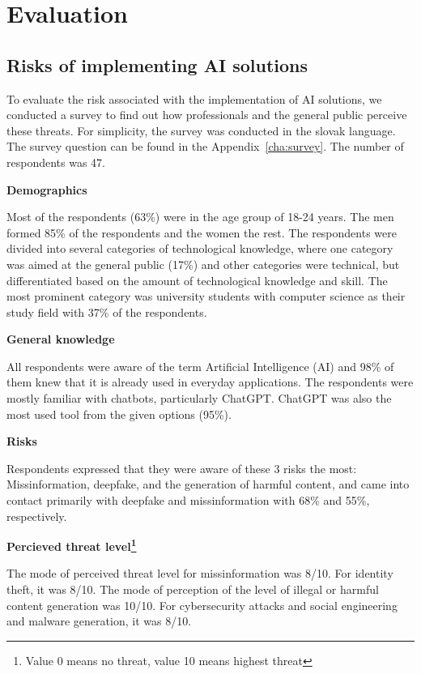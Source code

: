 \chapter{Evaluation \label{cha:eva}}

\section{Risks of implementing AI solutions \label{sec:eval_risks_survey}}
To evaluate the risk associated with the implementation of AI solutions, we conducted a survey to find out how professionals and the general public perceive these threats. For simplicity, the survey was conducted in the slovak language. The survey question can be found in the Appendix~\ref{cha:survey}. The number of respondents was 47.

\textbf{Demographics}

Most of the respondents (63\%) were in the age group of 18-24 years. The men formed 85\% of the respondents and the women the rest. The respondents were divided into several categories of technological knowledge, where one category was aimed at the general public (17\%) and other categories were technical, but differentiated based on the amount of technological knowledge and skill. The most prominent category was university students with computer science as their study field with 37\% of the respondents.

\textbf{General knowledge}

All respondents were aware of the term Artificial Intelligence (AI) and 98\% of them knew that it is already used in everyday applications. The respondents were mostly familiar with chatbots, particularly ChatGPT. ChatGPT was also the most used tool from the given options (95\%).

\textbf{Risks}

Respondents expressed that they were aware of these 3 risks the most: Missinformation, deepfake, and the generation of harmful content, and came into contact primarily with deepfake and missinformation with 68\% and 55\%, respectively.

\textbf{Percieved threat level\footnote{Value 0 means no threat, value 10 means highest threat}}

The mode of perceived threat level for missinformation was 8/10.
For identity theft, it was 8/10.
The mode of perception of the level of illegal or harmful content generation was 10/10.
For cybersecurity attacks and social engineering and malware generation, it was 8/10.


